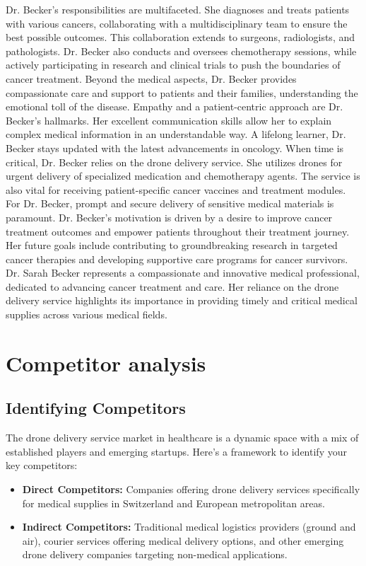 Dr. Becker's responsibilities are multifaceted. She diagnoses and treats patients with various cancers, collaborating with a multidisciplinary team to ensure the best possible outcomes. This collaboration extends to surgeons, radiologists, and pathologists. Dr. Becker also conducts and oversees chemotherapy sessions, while actively participating in research and clinical trials to push the boundaries of cancer treatment. Beyond the medical aspects, Dr. Becker provides compassionate care and support to patients and their families, understanding the emotional toll of the disease.
\newline
Empathy and a patient-centric approach are Dr. Becker's hallmarks. Her excellent communication skills allow her to explain complex medical information in an understandable way. A lifelong learner, Dr. Becker stays updated with the latest advancements in oncology.
\newline
When time is critical, Dr. Becker relies on the drone delivery service. She utilizes drones for urgent delivery of specialized medication and chemotherapy agents. The service is also vital for receiving patient-specific cancer vaccines and treatment modules. For Dr. Becker, prompt and secure delivery of sensitive medical materials is paramount.
\newline
Dr. Becker's motivation is driven by a desire to improve cancer treatment outcomes and empower patients throughout their treatment journey. Her future goals include contributing to groundbreaking research in targeted cancer therapies and developing supportive care programs for cancer survivors.
Dr. Sarah Becker represents a compassionate and innovative medical professional, dedicated to advancing cancer treatment and care. Her reliance on the drone delivery service highlights its importance in providing timely and critical medical supplies across various medical fields.
\section{Competitor analysis}
\subsection{Identifying Competitors}
The drone delivery service market in healthcare is a dynamic space with a mix of established players and emerging startups. Here's a framework to identify your key competitors:
\begin{itemize}
  \item \textbf{Direct Competitors:} Companies offering drone delivery services specifically for medical supplies in Switzerland and European metropolitan areas.
  \item \textbf{Indirect Competitors:} Traditional medical logistics providers (ground and air), courier services offering medical delivery options, and other emerging drone delivery companies targeting non-medical applications.
\end{itemize}

